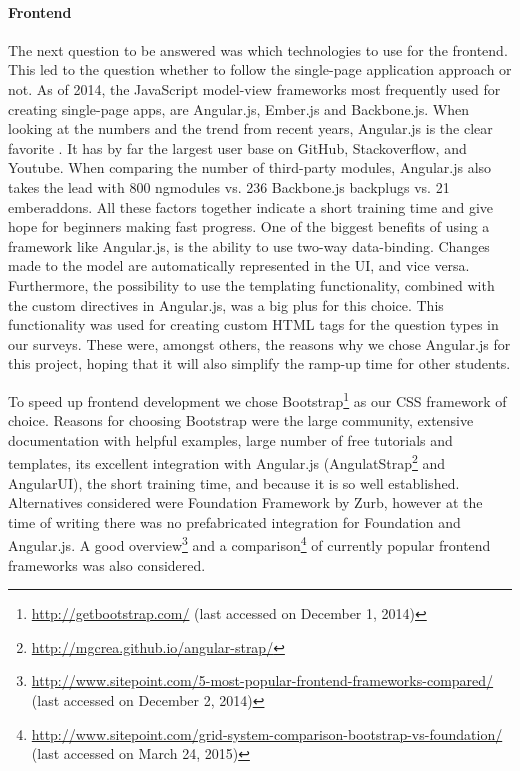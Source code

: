 	\paragraph{Frontend}

		The next question to be answered was which technologies to use for the frontend. This led to the question whether to follow the single-page application approach or not. As of 2014, the JavaScript model-view frameworks most frequently used for creating single-page apps, are Angular.js, Ember.js and Backbone.js. When looking at the numbers and the trend from recent years, Angular.js is the clear favorite \cite{AirPair2014MEAN}. It has by far the largest user base on GitHub, Stackoverflow, and Youtube. When comparing the number of third-party modules, Angular.js also takes the lead with 800 ngmodules vs. 236 Backbone.js backplugs vs. 21 emberaddons. All these factors together indicate a short training time and give hope for beginners making fast progress. One of the biggest benefits of using a framework like Angular.js, is the ability to use two-way data-binding. Changes made to the model are automatically represented in the UI, and vice versa. Furthermore, the possibility to use the templating functionality, combined with the custom directives in Angular.js, was a big plus for this choice. This functionality was used for creating custom HTML tags for the question types in our surveys. These were, amongst others, the reasons why we chose Angular.js for this project, hoping that it will also simplify the ramp-up time for other students.

		To speed up frontend development we chose Bootstrap\footnote{\url{http://getbootstrap.com/} (last accessed on December 1, 2014)} as our CSS framework of choice. Reasons for choosing Bootstrap were the large community, extensive documentation with helpful examples, large number of free tutorials and templates, its excellent integration with Angular.js (AngulatStrap\footnote{\url{http://mgcrea.github.io/angular-strap/}} and AngularUI), the short training time, and because it is so well established.
		Alternatives considered were Foundation Framework by Zurb, however at the time of writing there was no prefabricated integration for Foundation and Angular.js.
		A good overview\footnote{\url{http://www.sitepoint.com/5-most-popular-frontend-frameworks-compared/} (last accessed on December 2, 2014)} and a comparison\footnote{\url{http://www.sitepoint.com/grid-system-comparison-bootstrap-vs-foundation/} (last accessed on March 24, 2015)} of currently popular frontend frameworks was also considered.
	

